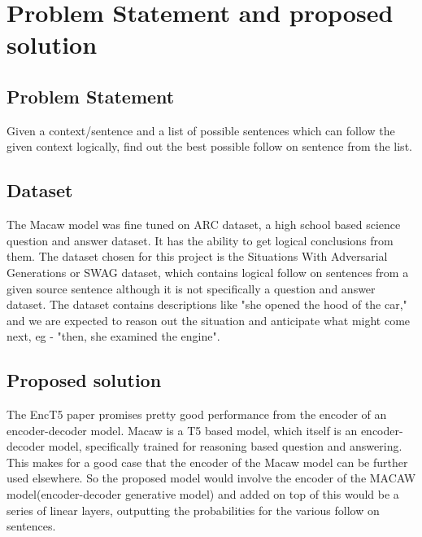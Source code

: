 
\chapter{Problem Statement and proposed solution} %

\label{Chapter4} %


\section{Problem Statement}
Given a context/sentence and a list of possible sentences which can follow the given context logically, find out the best possible follow on sentence from the list.

\section{Dataset}
The Macaw model was fine tuned on ARC dataset, a high school based science question and answer dataset. It has the ability to get logical conclusions from them. The dataset chosen for this project is the Situations With Adversarial Generations or SWAG dataset, which contains logical follow on sentences from a given source sentence although it is not specifically a question and answer dataset.
The dataset contains descriptions like "she opened the hood of the car," and we are expected to reason out the situation and anticipate what might come next, eg - "then, she examined the engine".

\section{Proposed solution}
The EncT5 paper promises pretty good performance from the encoder of an encoder-decoder model. Macaw is a T5 based model, which itself is an encoder-decoder model, specifically trained for reasoning based question and answering. This makes for a good case that the encoder of the Macaw model can be further used elsewhere.
So the proposed model would involve the encoder of the MACAW model(encoder-decoder generative model) and added on top of this would be a series of linear layers, outputting the probabilities for the various follow on sentences.



